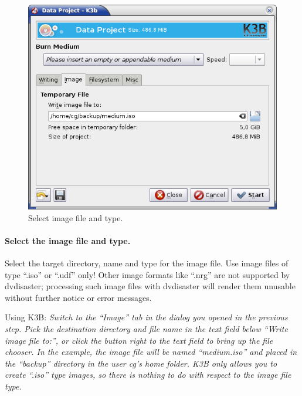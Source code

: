 \newpage
\begin{figure}[h]
\centerline{\includegraphics[width=\textwidth]{screenshots/make-iso4.png}}
\caption{Select image file and type.}  
\label{howto-augment-make-iso-filename}
\end{figure}

\paragraph{Select the image file and type.} Select the target directory,
name and type for the image file. Use image files of type ``.iso'' or ``.udf'' only!
Other image formats like ``.nrg'' are not supported by dvdisaster;
processing such image files with dvdisaster will render them unusable
without further notice or error messages.

\bigskip

Using K3B: {\em Switch to the ``Image'' tab in the dialog you opened
  in the previous step. Pick the destination directory and file name
  in the text field below ``Write image file to:'', or click the
  button right to the text field to bring up the file chooser.
  In the example, the image file will be named ``medium.iso'' and placed
  in the ``backup'' directory in the user cg's home folder. K3B only
  allows you to create ``.iso'' type images, so there is nothing to
  do with respect to the image file type. }

